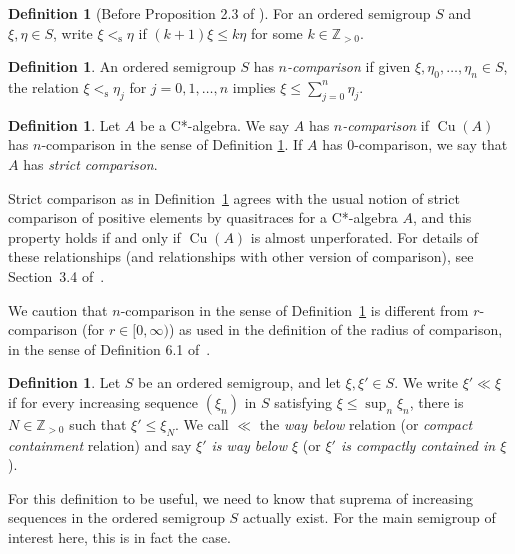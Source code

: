 \documentclass[10pt]{amsart}
\numberwithin{equation}{section}
\theoremstyle{definition}
\newtheorem{dfn}[thm]{Definition}
\newcommand{\N}{{\mathbb{Z}}_{> 0}}
\newcommand{\Cu}{{\operatorname{Cu}}}
\newcommand{\les}{<_{\operatorname{s}}}
\begin{document}
\begin{dfn}[Before Proposition 2.3 of \cite{AnPrTlVt}]\label{LeqS}
For an ordered semigroup $S$ and $\xi,\eta \in S$, write
$\xi \les \eta$ if $(k + 1)\xi \leq k \eta$ for some $k \in \N$.
\end{dfn}

\begin{dfn}\label{nCompDefn}
An ordered semigroup $S$ has \emph{$n$-comparison} if
given $\xi, \eta_{0}, \ldots, \eta_{n} \in S$,
the relation $\xi \les \eta_{j}$
for $j = 0, 1, \ldots, n$ implies $\xi \leq \sum_{j=0}^{n} \eta_{j}$.
\end{dfn}

\begin{dfn}\label{nCompA}
Let $A$ be a C*-algebra.
We say $A$ has \emph{$n$-comparison}
if $\Cu (A)$ has $n$-comparison in the sense of Definition
\ref{nCompDefn}.
If $A$ has 0-comparison, we say that $A$ has
{\emph{strict comparison}}.
\end{dfn}

Strict comparison as in Definition~\ref{nCompA} agrees
with the usual notion of strict comparison of positive elements
by quasitraces for a C*-algebra $A$, and this property holds
if and only if $\Cu (A)$ is almost unperforated.
For details of
these relationships (and relationships with other version of
comparison), see Section~3.4 of~\cite{AnPrTlVt}.

We caution that $n$-comparison in the sense of
Definition~\ref{nCompA} is
different from $r$-comparison (for $r \in [0,\infty)$)
as used in the definition of the radius of comparison, in the sense
of Definition 6.1 of~\cite{Toms06}.

\begin{dfn}\label{D_Cu_WayBelow}
Let $S$ be an ordered semigroup, and let $\xi, \xi' \in S$.
We write $\xi' \ll \xi$ if for every increasing sequence
$(\xi_n)$ in $S$ satisfying $\xi \leq \sup_n \xi_n$, there
is $N \in \N$ such that $\xi' \leq \xi_N$.
We call $\ll$
the \emph{way below} relation (or \emph{compact containment}
relation) and say \emph{$\xi'$ is way below $\xi$}
(or \emph{$\xi'$ is compactly contained in $\xi$}).
\end{dfn}

For this definition to be useful, we need to know that
suprema of increasing sequences in the ordered semigroup
$S$ actually exist.
For the main semigroup of interest here,
this is in fact the case.
\end{document}
